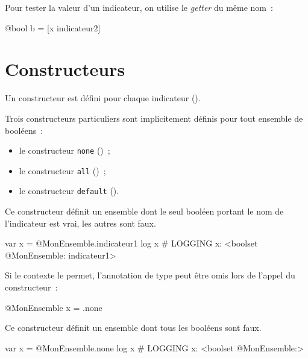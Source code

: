 Pour tester la valeur d'un indicateur, on utilise le \emph{getter} du même nom~:
\begin{galgas3}
@bool b = [x indicateur2]
\end{galgas3}










\section{Constructeurs}

Un constructeur est défini pour chaque indicateur ().

Trois constructeurs particuliers sont implicitement définis pour tout ensemble de booléens~:
\begin{itemize}
  \item le constructeur \texttt{none} ()~;
  \item le constructeur \texttt{all} ()~;
  \item le constructeur \texttt{default} ().
\end{itemize}


Ce constructeur définit un ensemble dont le seul booléen portant le nom de l'indicateur est vrai, les autres sont faux.

\begin{galgas3}
var x = @MonEnsemble.indicateur1
log x # LOGGING x: <boolset @MonEnsemble: indicateur1>
\end{galgas3}

Si le contexte le permet, l'annotation de type peut être omis lors de l'appel du constructeur~:
\begin{galgas3}
@MonEnsemble x = .none
\end{galgas3}



Ce constructeur définit un ensemble dont tous les booléens sont faux.

\begin{galgas3}
var x = @MonEnsemble.none
log x # LOGGING x: <boolset @MonEnsemble:>
\end{galgas3}

